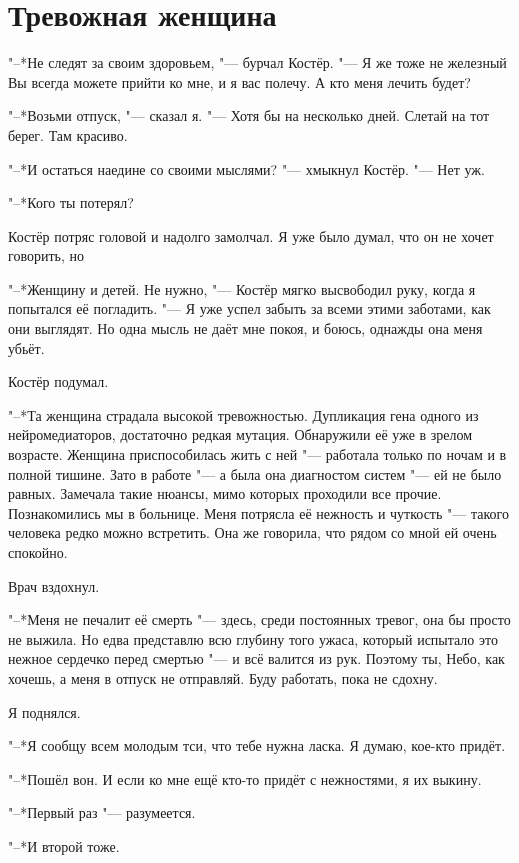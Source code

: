\section{Тревожная женщина}

"--*Не следят за своим здоровьем, "--- бурчал Костёр.
"--- Я же тоже не железный\ldotst
Вы всегда можете прийти ко мне, и я вас полечу.
А кто меня лечить будет?

"--*Возьми отпуск, "--- сказал я.
"--- Хотя бы на несколько дней.
Слетай на тот берег.
Там красиво.

"--*И остаться наедине со своими мыслями? "--- хмыкнул Костёр.
"--- Нет уж.

"--*Кого ты потерял?

Костёр потряс головой и надолго замолчал.
Я уже было думал, что он не хочет говорить, но\ldotst

"--*Женщину и детей.
Не нужно, "--- Костёр мягко высвободил руку, когда я попытался её погладить.
"--- Я уже успел забыть за всеми этими заботами, как они выглядят.
Но одна мысль не даёт мне покоя, и боюсь, однажды она меня убьёт.

Костёр подумал.

"--*Та женщина страдала высокой тревожностью.
Дупликация гена одного из нейромедиаторов, достаточно редкая мутация.
Обнаружили её уже в зрелом возрасте.
Женщина приспособилась жить с ней "--- работала только по ночам и в полной тишине.
Зато в работе "--- а была она диагностом систем "--- ей не было равных.
Замечала такие нюансы, мимо которых проходили все прочие.
Познакомились мы в больнице.
Меня потрясла её нежность и чуткость "--- такого человека редко можно встретить.
Она же говорила, что рядом со мной ей очень спокойно.

Врач вздохнул.

"--*Меня не печалит её смерть "--- здесь, среди постоянных тревог, она бы просто не выжила.
Но едва представлю всю глубину того ужаса, который испытало это нежное сердечко перед смертью "--- и всё валится из рук.
Поэтому ты, Небо, как хочешь, а меня в отпуск не отправляй.
Буду работать, пока не сдохну.

Я поднялся.

"--*Я сообщу всем молодым тси, что тебе нужна ласка.
Я думаю, кое-кто придёт.

"--*Пошёл вон.
И если ко мне ещё кто-то придёт с нежностями, я их выкину.

"--*Первый раз "--- разумеется.

"--*И второй тоже.

